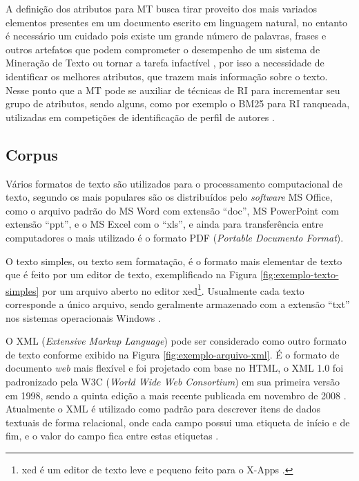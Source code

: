     A definição dos atributos para MT busca tirar proveito dos mais variados elementos presentes em um documento escrito em linguagem natural, no entanto é necessário um cuidado pois existe um grande número de palavras, frases e outros artefatos que podem comprometer o desempenho de um sistema de Mineração de Texto ou tornar a tarefa infactível \cite[p.~4]{Feldman:2006:TMH:1076381}, por isso a necessidade de identificar os melhores atributos, que trazem mais informação sobre o texto. 
    Nesse ponto que a MT pode se auxiliar de técnicas de RI para incrementar seu grupo de atributos, sendo alguns, como por exemplo o BM25 para RI ranqueada, utilizadas em competições de identificação de perfil de autores \cite{WEREN_MESTRADO_2014,WEREN_CLEF_2014,WEREN_ARTIGO_2014}. %
    
    
    
    \subsection{Corpus} \label{subsec:Corpus}
        Vários formatos de texto são utilizados para o processamento computacional de texto, segundo  os mais populares são os distribuídos pelo \textit{software} MS Office, como o arquivo padrão do MS Word com extensão ``doc'', MS PowerPoint com extensão ``ppt'', e o MS Excel com o ``xls'', e ainda para transferência entre computadores o mais utilizado é o formato PDF (\textit{Portable Documento Format}).
        
        
        
        O texto simples, ou texto sem formatação, é o formato mais elementar de texto que é feito por um editor de texto, exemplificado na Figura \ref{fig:exemplo-texto-simples} por um arquivo aberto no editor xed\footnote{xed é um editor de texto leve e pequeno feito para o X-Apps \cite{LinuxMintXed2019}.}.
        Usualmente cada texto corresponde a único arquivo, sendo geralmente armazenado com a extensão ``txt'' nos sistemas operacionais Windows \cite[p.~6]{Jo2018TMCIBDC}.
        
        O XML (\textit{Extensive Markup Language}) pode ser considerado como outro formato de texto conforme exibido na Figura \ref{fig:exemplo-arquivo-xml}. 
        É o formato de documento \textit{web} mais flexível e foi projetado com base no HTML, o XML 1.0 foi padronizado pela W3C (\textit{World Wide Web Consortium}) em sua primeira versão em 1998, sendo a quinta edição a mais recente publicada em novembro de 2008 \cite{XML10_5ed_2008}.
        Atualmente o XML é utilizado como padrão para descrever itens de dados textuais de forma relacional, onde cada campo possui uma etiqueta de início e de fim, e o valor do campo fica entre estas etiquetas \cite[p.~6]{Jo2018TMCIBDC}.
        
